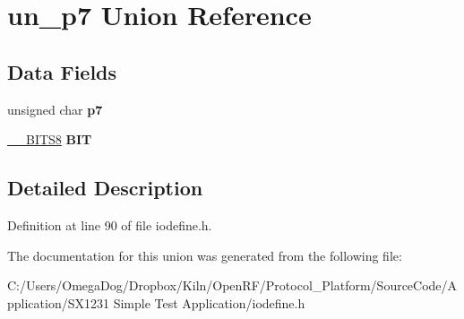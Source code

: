\hypertarget{unionun__p7}{\section{un\-\_\-p7 Union Reference}
\label{unionun__p7}
}
\subsection*{Data Fields}
\begin{DoxyCompactItemize}
\item 
\hypertarget{unionun__p7_af9a289ac4d0dfa63a4522f10dc2814d3}{unsigned char {\bfseries p7}}\label{unionun__p7_af9a289ac4d0dfa63a4522f10dc2814d3}

\item 
\hypertarget{unionun__p7_af8793eaf4877dc84da0c56c06a914b88}{\hyperlink{struct_____b_i_t_s8}{\-\_\-\-\_\-\-B\-I\-T\-S8} {\bfseries B\-I\-T}}\label{unionun__p7_af8793eaf4877dc84da0c56c06a914b88}

\end{DoxyCompactItemize}


\subsection{Detailed Description}


Definition at line 90 of file iodefine.\-h.



The documentation for this union was generated from the following file\-:\begin{DoxyCompactItemize}
\item 
C\-:/\-Users/\-Omega\-Dog/\-Dropbox/\-Kiln/\-Open\-R\-F/\-Protocol\-\_\-\-Platform/\-Source\-Code/\-Application/\-S\-X1231 Simple Test Application/iodefine.\-h\end{DoxyCompactItemize}
